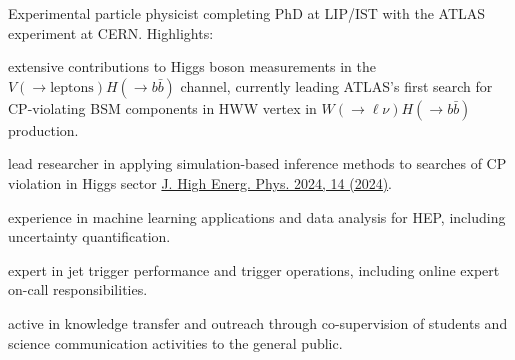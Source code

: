 
Experimental particle physicist completing PhD at LIP/IST with the ATLAS experiment at CERN. Highlights:\\

\begin{cvitems}
    \item extensive contributions to Higgs boson measurements in the $V(\to \textrm{leptons}) H(\to b\bar{b})$ channel, currently leading ATLAS's first search for CP-violating BSM components in HWW vertex in $W(\to \ell \nu) H(\to b\bar{b})$ production. 
    \item lead researcher in applying simulation-based inference methods to searches of CP violation in Higgs sector \href{https://doi.org/10.1007/JHEP04(2024)014}{J. High Energ. Phys. 2024, 14 (2024)}. 
    \item experience in machine learning applications and data analysis for HEP, including uncertainty quantification.
    \item expert in jet trigger performance and trigger operations, including online expert on-call responsibilities.
    \item active in knowledge transfer and outreach through co-supervision of students and science communication activities to the general public.
    \item[]
\end{cvitems}
